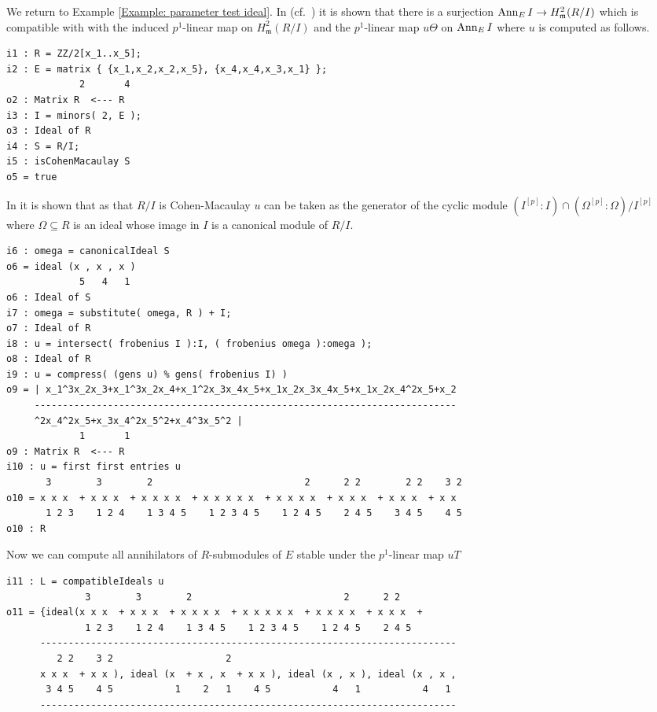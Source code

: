 \documentclass{amsart}
\begin{document}
\begin{example}

We return to Example \ref{Example: parameter test ideal}.
In (cf.~\cite[\S 9]{KatzmanParameterTestIdealOfCMRings}) it is shown that
there is a surjection $\operatorname{{Ann}}_E I \rightarrow H^2_{\mathfrak{m}} (R/I)$
which is compatible with with the induced $p^1$-linear map on $H^2_{\mathfrak{m}} (R/I)$
and the $p^1$-linear map $u \Theta$ on $\operatorname{{Ann}}_E I$ where $u$ is computed as follows.

\medskip
\begin{verbatim}
i1 : R = ZZ/2[x_1..x_5];
i2 : E = matrix { {x_1,x_2,x_2,x_5}, {x_4,x_4,x_3,x_1} };
             2       4
o2 : Matrix R  <--- R
i3 : I = minors( 2, E );
o3 : Ideal of R
i4 : S = R/I;
i5 : isCohenMacaulay S
o5 = true
\end{verbatim}
\medskip

In \cite{KatzmanParameterTestIdealOfCMRings} it is shown that as that $R/I$ is Cohen-Macaulay $u$
can be taken as the generator of the cyclic module $(I^{[p]}:I) \cap (\Omega^{[p]}:\Omega)/I^{[p]}$
where $\Omega \subseteq R$ is an ideal whose image in $I$ is a canonical module of $R/I$.


\medskip
{\footnotesize
\begin{verbatim}
i6 : omega = canonicalIdeal S
o6 = ideal (x , x , x )
             5   4   1
o6 : Ideal of S
i7 : omega = substitute( omega, R ) + I;
o7 : Ideal of R
i8 : u = intersect( frobenius I ):I, ( frobenius omega ):omega );
o8 : Ideal of R
i9 : u = compress( (gens u) % gens( frobenius I) )
o9 = | x_1^3x_2x_3+x_1^3x_2x_4+x_1^2x_3x_4x_5+x_1x_2x_3x_4x_5+x_1x_2x_4^2x_5+x_2
     ---------------------------------------------------------------------------
     ^2x_4^2x_5+x_3x_4^2x_5^2+x_4^3x_5^2 |
             1       1
o9 : Matrix R  <--- R
i10 : u = first first entries u
       3        3        2                           2      2 2        2 2    3 2
o10 = x x x  + x x x  + x x x x  + x x x x x  + x x x x  + x x x  + x x x  + x x
       1 2 3    1 2 4    1 3 4 5    1 2 3 4 5    1 2 4 5    2 4 5    3 4 5    4 5
o10 : R
\end{verbatim}
}
\medskip

Now we can compute all annihilators of $R$-submodules of $E$ stable under the $p^1$-linear map $uT$

\medskip
{\footnotesize
\begin{verbatim}
i11 : L = compatibleIdeals u
              3        3        2                           2      2 2
o11 = {ideal(x x x  + x x x  + x x x x  + x x x x x  + x x x x  + x x x  +
              1 2 3    1 2 4    1 3 4 5    1 2 3 4 5    1 2 4 5    2 4 5
      --------------------------------------------------------------------------
         2 2    3 2                    2
      x x x  + x x ), ideal (x  + x , x  + x x ), ideal (x , x ), ideal (x , x ,
       3 4 5    4 5           1    2   1    4 5           4   1           4   1
      --------------------------------------------------------------------------


\end{verbatim}}
\end{example}
\end{document}
